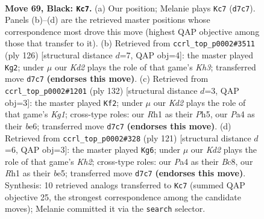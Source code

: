 \documentclass[11pt]{article}
\begin{document}
\clearpage

\begin{figure}[p]\centering
\begin{subfigure}{0.46\textwidth}\centering
\resizebox{\linewidth}{!}{%
\newchessgame
\chessboard[
  setfen={8/3k4/2p5/3p4/p7/8/3K4/7r b - - 1 69},
  showmover=false,
  pgfstyle=straightmove, color=movearrow, markmove={d7-c7}
]}
\caption{}
\end{subfigure}\hfill
\begin{subfigure}{0.46\textwidth}\centering
\resizebox{\linewidth}{!}{%
\newchessgame
\chessboard[
  setfen={1r6/5k2/2R5/5p2/5P2/6PK/8/8 w - - 5 64},
  showmover=false,
  pgfstyle=straightmove, color=movearrow, markmove={h3-g2}
]}
\caption{}
\end{subfigure}
\\[4pt]
\begin{subfigure}{0.46\textwidth}\centering
\resizebox{\linewidth}{!}{%
\newchessgame
\chessboard[
  setfen={8/8/4b3/7P/1k6/5P2/6P1/6K1 w - - 0 67},
  showmover=false,
  pgfstyle=straightmove, color=movearrow, markmove={g1-f2}
]}
\caption{}
\end{subfigure}\hfill
\begin{subfigure}{0.46\textwidth}\centering
\resizebox{\linewidth}{!}{%
\newchessgame
\chessboard[
  setfen={2b5/7k/7p/4B1p1/8/3K4/8/8 b - - 1 61},
  showmover=false,
  pgfstyle=straightmove, color=movearrow, markmove={h7-g6}
]}
\caption{}
\end{subfigure}
\caption{\textbf{Move 69, Black: \texttt{Kc7}.} (a) Our position; Melanie plays \texttt{Kc7} (\texttt{d7c7}). Panels (b)--(d) are the retrieved master positions whose correspondence most drove this move (highest QAP objective among those that transfer to it). (b) Retrieved from \texttt{ccrl\_top\_p0002\#3511} (ply 126) [structural distance $d$=7, QAP obj=4]: the master played \texttt{Kg2}; under $\mu$ our \emph{Kd2} plays the role of that game's \emph{Kh3}; transferred move \texttt{d7c7} \textbf{(endorses this move)}. (c) Retrieved from \texttt{ccrl\_top\_p0002\#1201} (ply 132) [structural distance $d$=3, QAP obj=3]: the master played \texttt{Kf2}; under $\mu$ our \emph{Kd2} plays the role of that game's \emph{Kg1}; cross-type roles: our \emph{R}h1 as their \emph{P}h5, our \emph{P}a4 as their \emph{b}e6; transferred move \texttt{d7c7} \textbf{(endorses this move)}. (d) Retrieved from \texttt{ccrl\_top\_p0002\#328} (ply 121) [structural distance $d$=6, QAP obj=3]: the master played \texttt{Kg6}; under $\mu$ our \emph{Kd2} plays the role of that game's \emph{Kh2}; cross-type roles: our \emph{P}a4 as their \emph{B}c8, our \emph{R}h1 as their \emph{b}e5; transferred move \texttt{d7c7} \textbf{(endorses this move)}. Synthesis: 10 retrieved analogs transferred to \texttt{Kc7} (summed QAP objective 25, the strongest correspondence among the candidate moves); Melanie committed it via the \texttt{search} selector.}
\label{fig:thought-m137}
\end{figure}
\end{document}
